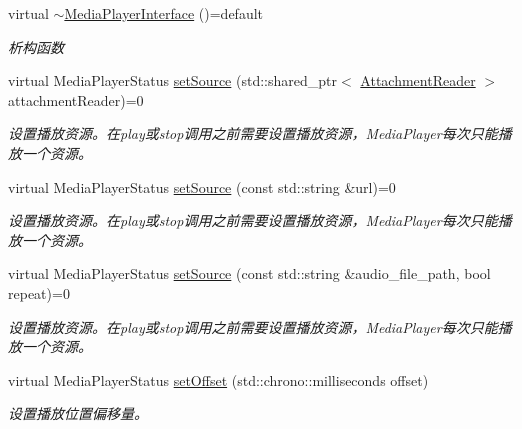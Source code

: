 \begin{DoxyCompactItemize}
\item 
\mbox{\label{classduerOSDcsSDK_1_1sdkInterfaces_1_1MediaPlayerInterface_aab7cbf3d5682cc913d065922af17a310}} 
virtual \hyperlink{classduerOSDcsSDK_1_1sdkInterfaces_1_1MediaPlayerInterface_aab7cbf3d5682cc913d065922af17a310}{$\sim$\+Media\+Player\+Interface} ()=default
\begin{DoxyCompactList}\small\item\em 析构函数 \end{DoxyCompactList}\item 
virtual Media\+Player\+Status \hyperlink{classduerOSDcsSDK_1_1sdkInterfaces_1_1MediaPlayerInterface_abcc2b939b8e4549b1e16168d0efe36ff}{set\+Source} (std\+::shared\+\_\+ptr$<$ \hyperlink{classduerOSDcsSDK_1_1sdkInterfaces_1_1AttachmentReader}{Attachment\+Reader} $>$ attachment\+Reader)=0
\begin{DoxyCompactList}\small\item\em 设置播放资源。在play或stop调用之前需要设置播放资源，\+Media\+Player每次只能播放一个资源。 \end{DoxyCompactList}\item 
virtual Media\+Player\+Status \hyperlink{classduerOSDcsSDK_1_1sdkInterfaces_1_1MediaPlayerInterface_a3061ab7f0867a3c8a38aad71bf06a6d1}{set\+Source} (const std\+::string \&url)=0
\begin{DoxyCompactList}\small\item\em 设置播放资源。在play或stop调用之前需要设置播放资源，\+Media\+Player每次只能播放一个资源。 \end{DoxyCompactList}\item 
virtual Media\+Player\+Status \hyperlink{classduerOSDcsSDK_1_1sdkInterfaces_1_1MediaPlayerInterface_a0fb29a6364ca2586ea0328f52f19ed1a}{set\+Source} (const std\+::string \&audio\+\_\+file\+\_\+path, bool repeat)=0
\begin{DoxyCompactList}\small\item\em 设置播放资源。在play或stop调用之前需要设置播放资源，\+Media\+Player每次只能播放一个资源。 \end{DoxyCompactList}\item 
virtual Media\+Player\+Status \hyperlink{classduerOSDcsSDK_1_1sdkInterfaces_1_1MediaPlayerInterface_aee790a88554e46581e17bcf0e1f8d2ec}{set\+Offset} (std\+::chrono\+::milliseconds offset)
\begin{DoxyCompactList}\small\item\em 设置播放位置偏移量。 \end{DoxyCompactList}\item 

\end{DoxyCompactItemize}
